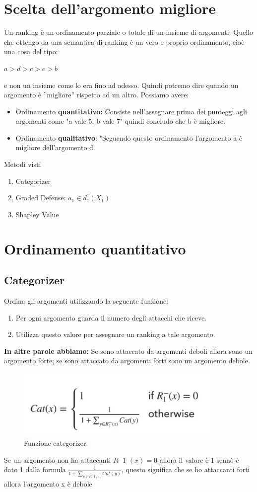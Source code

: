 \section{Scelta dell’argomento migliore}
Un ranking è un ordinamento parziale o totale di un insieme di argomenti. Quello che ottengo da una semantica di ranking è un vero e proprio ordinamento, cioè una cosa del tipo:
\begin{center}
    $a > d > c > e >b$
\end{center}
e non un insieme come lo era fino ad adesso. Quindi potremo dire quando un argomento è ”migliore” rispetto ad un altro. Possiamo avere:
\begin{itemize}
    \item Ordinamento \textbf{quantitativo:} Consiste nell’assegnare prima dei punteggi agli argomenti come "a vale 5, b vale 7" quindi concludo che b è migliore.
    \item Ordinamento \textbf{qualitativo}: "Seguendo questo ordinamento l’argomento a è migliore dell’argomento d.
\end{itemize}
\begin{center}
    Metodi visti
\end{center}
\begin{enumerate}
    \item Categorizer
    \item Graded Defense: $a_1 \in d^1_{1} (X_1)$
    \item Shapley Value
\end{enumerate}
\section{Ordinamento quantitativo}
\subsection{Categorizer}
Ordina gli argomenti utilizzando la seguente funzione:
\begin{enumerate}
    \item Per ogni argomento guarda il numero degli attacchi che riceve.
    \item Utilizza questo valore per assegnare un ranking a tale argomento.
\end{enumerate}
\textbf{In altre parole abbiamo:} Se sono attaccato da argomenti deboli allora sono un argomento forte; se sono attaccato da argomenti forti sono un argomento debole.
\begin{figure}[htp]
	\centering
    \includegraphics[width=10cm, keepaspectratio]{img/Cap8/quantitativo1.png}
    \caption{Funzione categorizer.}
\end{figure}
Se un argomento non ha attaccanti $R^-1$ $(x) = 0$ allora il valore è 1 sennò è dato 1 dalla formula
$\frac{1}{1+\sum_{y\in R^-1_(x)} Cat(y)}$, questo significa che se ho attaccanti forti allora l’argomento x è debole


